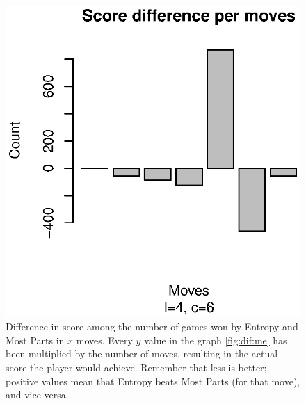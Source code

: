 \documentclass[preprint,12pt]{elsarticle}
\begin{document}
%
\begin{figure}[!htb]
\centering
\includegraphics{score-dif-46.eps}
\caption{Difference in score among the number of games won by Entropy and Most
  Parts in $x$ moves. Every $y$ value in the graph \ref{fig:dif:me}
  has been multiplied by the number of moves, resulting in the actual
  score the player would achieve. Remember that less is better;
  positive values mean that Entropy beats Most Parts (for that move),
  and vice versa. \label{fig:scoredif:me}}
\end{figure}
%
\end{document}
